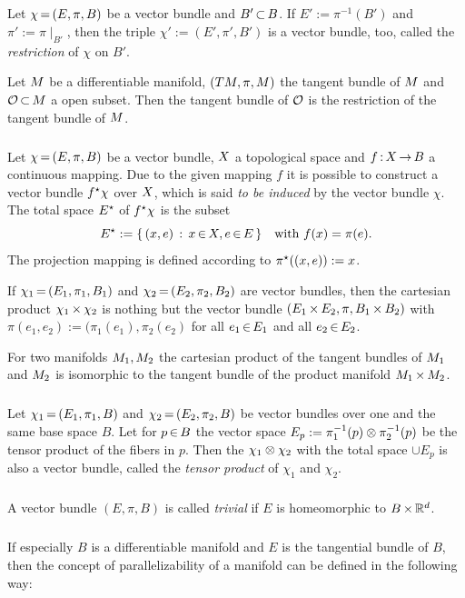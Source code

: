\documentclass[11pt,twoside]{article}
\begin{document}
\subparagraph{}
Let $\chi {\,=\,} (E,\pi,B)$ be a vector bundle and $B' {\,\subset\,} B$.
If $E' := \pi^{-1}(B')$ and $\pi' := \pi \mid_{B'}$,
then the triple
$\chi' := (E',\pi',B')$ is a vector bundle,
too,
called the \textit{restriction} of $\chi$ on $B'$.

\begin{example}
Let ${M}$ be a differentiable manifold,
$(T{M},\pi,{M})$ the tangent bundle of ${M}$ and
$\mathcal{O} {\,\subset\,} {M}$ a open subset.
Then the tangent bundle of $\mathcal{O}$
is the restriction of the tangent bundle of ${M}$.
\end{example}

\subparagraph{}
Let $\chi {\,=\,} (E,\pi,B)$ be a vector bundle,
$X$ a topological space and $f {\,:\,} X {\,\to\,} B$ a continuous mapping.
Due to the given mapping $f$ it is possible to construct
a vector bundle $f^{\star}\chi$ over $X$,
which is said \textit{to be induced} by the vector bundle $\chi$.
The total space $E^{\star}$ of $f^{\star}\chi$ is the subset
\[
E^{\star} := \{ \, (x,e) \,: \, x {\,\in\,} X, e {\,\in\,} E \, \} \quad
\mbox{with } f(x) = \pi(e).
\]
The projection mapping is defined according to $\pi^{\star}((x,e)) := x$.

If $\chi_1 {\,=\,} (E_1,\pi_1,B_1)$ and $\chi_2 {\,=\,} (E_2,\pi_2,B_2)$
are vector bundles,
then the cartesian product $\chi_1 {\,\times\,} \chi_2$ is nothing but 
the vector bundle
$(E_1 {\,\times\,} E_2, \pi, B_1 {\,\times\,} B_2)$
with $\pi(e_1,e_2) := (\pi_1(e_1),
      \pi_2(e_2)$ for all $e_1 {\,\in\,} E_1$ and all $e_2 {\,\in\,} E_2$.

\begin{example}
For two manifolds ${M}_1,{M}_2$ the cartesian product
of the tangent bundles of ${M}_1$ and ${M}_2$ is isomorphic
to the tangent bundle of the product manifold ${M}_1 {\,\times\,} {M}_2$.
\end{example}

\subparagraph{}
Let $\chi_1 {\,=\,} (E_1,\pi_1,B)$ and $\chi_2 {\,=\,} (E_2,\pi_2,B)$
be vector bundles over one and the same base space $B$.
Let for $p {\,\in\,} B$ the vector space
$E_p := \pi_1^{-1}(p) \otimes \pi_2^{-1}(p)$
be the tensor product of the fibers in $p$.
Then the $\chi_1 \otimes \chi_2$ with the total space $\cup E_p$ is also
a vector bundle,
called the \textit{tensor product} of $\chi_1$ and $\chi_2$.

\subparagraph{}
A vector bundle $(E,\pi,B)$ is called \textit{trivial}
if $E$ is homeomorphic to $B {\,\times\,} {\mathbb{R}}^d$.

\subparagraph{}
If especially $B$ is a differentiable manifold
and $E$ is the tangential bundle of $B$,
then the concept of parallelizability of a manifold can be defined
in the following way:
\end{document}

